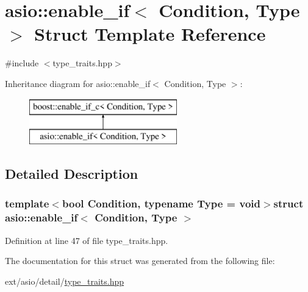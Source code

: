 \hypertarget{structasio_1_1enable__if}{}\section{asio\+:\+:enable\+\_\+if$<$ Condition, Type $>$ Struct Template Reference}
\label{structasio_1_1enable__if}


{\ttfamily \#include $<$type\+\_\+traits.\+hpp$>$}

Inheritance diagram for asio\+:\+:enable\+\_\+if$<$ Condition, Type $>$\+:\begin{figure}[H]
\begin{center}
\leavevmode
\includegraphics[height=2.000000cm]{structasio_1_1enable__if}
\end{center}
\end{figure}


\subsection{Detailed Description}
\subsubsection*{template$<$bool Condition, typename Type = void$>$struct asio\+::enable\+\_\+if$<$ Condition, Type $>$}



Definition at line 47 of file type\+\_\+traits.\+hpp.



The documentation for this struct was generated from the following file\+:\begin{DoxyCompactItemize}
\item 
ext/asio/detail/\hyperlink{asio_2detail_2type__traits_8hpp}{type\+\_\+traits.\+hpp}\end{DoxyCompactItemize}
